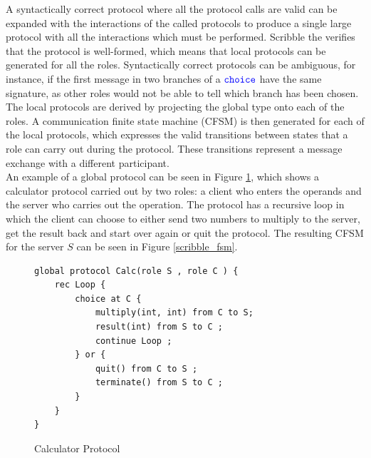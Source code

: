 \documentclass[12pt,twoside]{report}
\begin{document}
A syntactically correct protocol where all the protocol calls are valid can be expanded with the interactions of the called protocols to produce a single large protocol with all the interactions which must be performed. Scribble the verifies that the protocol is well-formed, which means that local protocols can be generated for all the roles. Syntactically correct protocols can be ambiguous, for instance, if the first message in two branches of a ${\color{blue}\mathtt{choice}}$ have the same signature, as other roles would not be able to tell which branch has been chosen. The local protocols are derived by projecting the global type onto each of the roles. A communication finite state machine (CFSM) is then generated for each of the local protocols, which expresses the valid transitions between states that a role can carry out during the protocol. These transitions represent a message exchange with a different participant.\\

An example of a global protocol can be seen in Figure \ref{scribble_protocol}, which shows a calculator protocol carried out by two roles: a client who enters the operands and the server who carries out the operation. The protocol has a recursive loop in which the client can choose to either send two numbers to multiply to the server, get the result back and start over again or quit the protocol. The resulting CFSM for the server $S$ can be seen in Figure \ref{scribble_fsm}.\\

\begin{figure}[h]
    \centering
    \lstset{language=Scribble}
    \begin{lstlisting}
global protocol Calc(role S , role C ) {
    rec Loop {
    	choice at C {
    		multiply(int, int) from C to S;
    		result(int) from S to C ;
    		continue Loop ;
    	} or {
    		quit() from C to S ;
    		terminate() from S to C ;
    	}
    }
}
    \end{lstlisting}
    \caption{Calculator Protocol}
    \label{scribble_protocol}
\end{figure}{}
\end{document}
